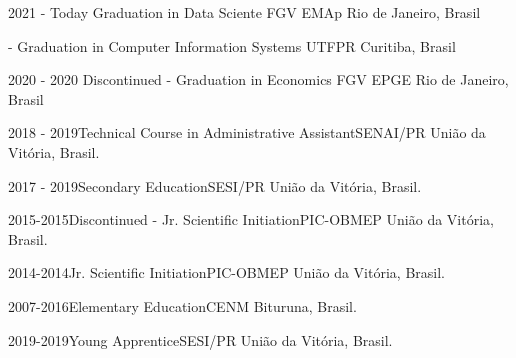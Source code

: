 \begin{paracol}{2}
\begin{rightcolumn}
		
		\vspace{0.9pt}
		\vspace{0.9pt}
		
		{
			\cvevent
			{2021 - Today}
			{Graduation in Data Sciente}
			{FGV EMAp \newline Rio de Janeiro, Brasil}
			\vfill\null
			\vfill\null
			
			\cvevent
			{-}
			{Graduation in Computer Information Systems}
			{UTFPR \newline Curitiba, Brasil}
			\vfill\null
			\vfill\null
			
			\cvevent
			{2020 - 2020}
			{Discontinued - Graduation in Economics}
			{FGV EPGE \newline Rio de Janeiro, Brasil}
			\vfill\null
			\vfill\null
			
			\cvevent
			{2018 - 2019}{Technical Course in Administrative Assistant}{SENAI/PR \newline União da Vitória, Brasil.}
			\vfill\null
			\vfill\null
			
			\cvevent
			{2017 - 2019}{Secondary Education}{SESI/PR \newline União da Vitória, Brasil.}
			\vfill\null
			\vfill\null
			
			\cvevent
			{2015-2015}{Discontinued - Jr. Scientific Initiation}{PIC-OBMEP \newline União da Vitória, Brasil.}
			\vfill\null
			\vfill\null
			
			\cvevent
			{2014-2014}{Jr. Scientific Initiation}{PIC-OBMEP \newline União da Vitória, Brasil.}
			\vfill\null
			\vfill\null
			
			\cvevent
			{2007-2016}{Elementary Education}{CENM \newline Bituruna, Brasil.}
			\vfill\null
			\vfill\null}
		
		
		{
			\cvevent
			{2019-2019}{Young Apprentice}{SESI/PR \newline União da Vitória, Brasil.}
			\vfill\null	
			\vfill\null}
		
		\newpage
		
		

\end{rightcolumn}
\end{paracol}
